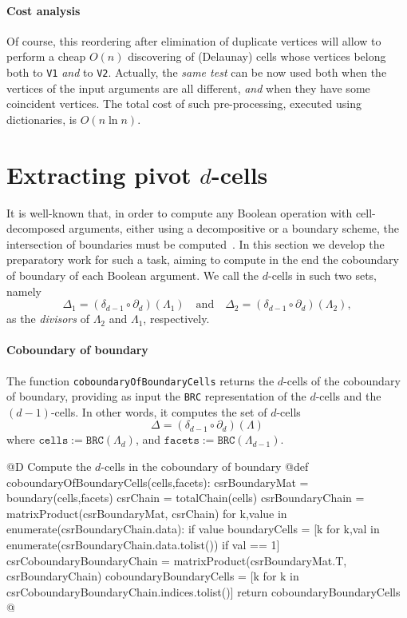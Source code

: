 \documentclass[11pt,oneside]{article}	%
\begin{document}
\paragraph{Cost analysis} 
Of course, this reordering after elimination of duplicate vertices will allow to perform a cheap $O(n)$ discovering of (Delaunay) cells whose vertices belong both to \texttt{V1} \emph{and} to \texttt{V2}. 
Actually, the \emph{same test} can be now used both when the vertices of the input arguments are all different, \emph{and} when they have some coincident vertices.
The total cost of such pre-processing, executed using dictionaries, is $O(n\ln n)$.


\section{Extracting pivot $d$-cells}

It is well-known that, in order to compute any Boolean operation with cell-decomposed arguments, either using a decompositive or a boundary scheme, the intersection of boundaries must be computed~\cite{Paoluzzi:1989:BAO:70248.70249}. In this section we develop the preparatory work for such a task, aiming to compute in the end the coboundary of boundary of each Boolean argument. We call the $d$-cells in such two sets, namely
\[
\Delta_1 = (\delta_{d-1}\circ\partial_d)(\Lambda_1)
\quad\mbox{and}\quad
\Delta_2 = (\delta_{d-1}\circ\partial_d)(\Lambda_2),
\]
as the \emph{divisors} of $\Lambda_2$ and $\Lambda_1$, respectively.


\paragraph{Coboundary of boundary}

The function \texttt{coboundaryOfBoundaryCells} returns the $d$-cells of the coboundary of boundary, providing as input the \texttt{BRC} representation of the $d$-cells and the $(d-1)$-cells. In other words, it computes the set of $d$-cells
\[
\Delta = (\delta_{d-1}\circ\partial_d)(\Lambda)
\]
where $\texttt{cells} := \texttt{BRC}(\Lambda_d)$, and $\texttt{facets} := \texttt{BRC}(\Lambda_{d-1})$.

@D Compute the $d$-cells in the coboundary of boundary
@{def coboundaryOfBoundaryCells(cells,facets):
    csrBoundaryMat = boundary(cells,facets)
    csrChain = totalChain(cells)
    csrBoundaryChain = matrixProduct(csrBoundaryMat, csrChain)
    for k,value in enumerate(csrBoundaryChain.data):
        if value %
    boundaryCells = [k for k,val in enumerate(csrBoundaryChain.data.tolist())
                               if val == 1]
    csrCoboundaryBoundaryChain = matrixProduct(csrBoundaryMat.T, csrBoundaryChain)
    coboundaryBoundaryCells = [k for k in csrCoboundaryBoundaryChain.indices.tolist()]
    return coboundaryBoundaryCells
@}
\end{document}
